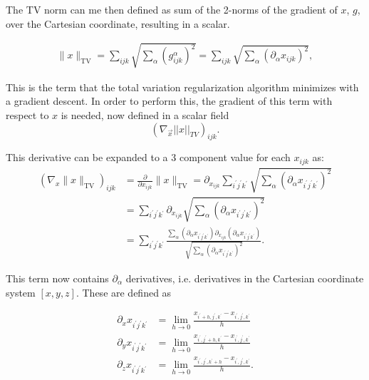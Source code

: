 The TV norm can me then defined as sum of the 2-norms of the gradient of $x$, $g$, over the Cartesian coordinate, resulting in a scalar.

\begin{align}
\lVert x \rVert_\text{TV}=\sum\limits_{ijk} \sqrt{\sum\limits_\alpha \left(g^\alpha_{ijk}\right)^2}=\sum\limits_{ijk} \sqrt{\sum\limits_\alpha \left(\partial_\alpha x_{ijk}\right)^2},
\end{align}

This is the term that the total variation regularization algorithm minimizes with a gradient descent. In order to perform this, the gradient of this term with respect to $x$ is needed, now defined in a scalar field
\begin{equation}
 (\nabla_{\vec{x}} || x ||_{TV})_{ijk}.
\end{equation} 

This derivative can be expanded to a 3 component value for each $x_{ijk}$ as:
\begin{align}
\left(\nabla_x \lVert x \rVert_\text{TV}\right)_{ijk}&= \frac{\partial}{\partial x_{ijk}} \lVert x \rVert_\text{TV} = \partial_{x_{ijk}} \sum\limits_{i^\prime j^\prime k^\prime} \sqrt{\sum\limits_\alpha \left(\partial_\alpha x_{i^\prime j^\prime k^\prime}\right)^2}\nonumber
\\
&= \sum\limits_{i^\prime j^\prime k^\prime} \partial_{x_{ijk}}\sqrt{\sum\limits_\alpha \left(\partial_\alpha x_{i^\prime j^\prime k^\prime}\right)^2} \nonumber \\ 
&=\sum\limits_{i^\prime j^\prime k^\prime} \frac{\sum_\alpha\left(\partial_\alpha x_{i^\prime j^\prime k^\prime}\right) \partial_{x_{ijk}} \left(\partial_\alpha x_{i^\prime j^\prime k^\prime}\right)}{\sqrt{\sum\limits_\alpha \left(\partial_\alpha x_{i^\prime j^\prime k^\prime}\right)^2}}.\label{eq:gradientTVdisc}
\end{align}

This term now contains $\partial_\alpha$ derivatives, i.e. derivatives in the Cartesian coordinate system $[x,y,z]$. These are defined as

\begin{align}
\partial_x x_{i^\prime j^\prime k^\prime} &= \lim\limits_{h\to 0} \frac{x_{i^\prime+h,j^\prime,k^\prime}-x_{i^\prime, j^\prime, k^\prime}}{h} \nonumber \\
\partial_y x_{i^\prime j^\prime k^\prime} &= \lim\limits_{h\to 0} \frac{x_{i^\prime,j^\prime+h,k^\prime}-x_{i^\prime, j^\prime, k^\prime}}{h} \nonumber \\
\partial_z x_{i^\prime j^\prime k^\prime} &= \lim\limits_{h\to 0} \frac{x_{i^\prime,j^\prime,k^\prime+h}-x_{i^\prime, j^\prime, k^\prime}}{h}.\label{eq:derivativedef}
\end{align}

